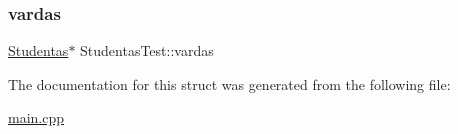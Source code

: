 \mbox{\label{struct_studentas_test_a4335c9cb4510f1493b4d702210b37bd6}} 
\subsubsection{\texorpdfstring{vardas}{vardas}}
{\footnotesize\ttfamily \mbox{\hyperlink{class_studentas}{Studentas}}$\ast$ Studentas\+Test\+::vardas}



The documentation for this struct was generated from the following file\+:\begin{DoxyCompactItemize}
\item 
\mbox{\hyperlink{main_8cpp}{main.\+cpp}}\end{DoxyCompactItemize}
